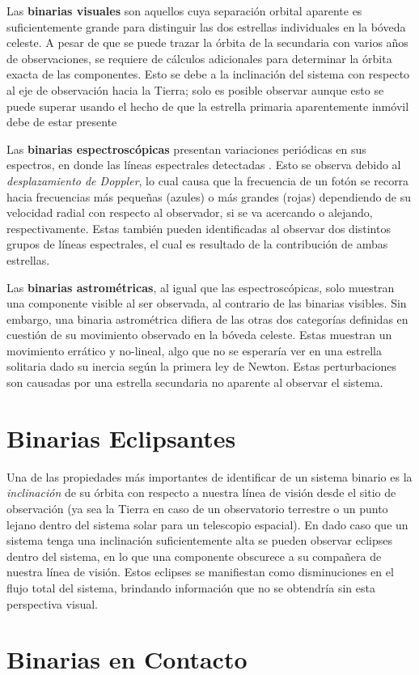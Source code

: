 Las \textbf{binarias visuales} son aquellos cuya separación orbital aparente es
suficientemente grande para distinguir las dos estrellas individuales en la
bóveda celeste. A pesar de que se puede trazar la órbita de la secundaria con
varios años de observaciones, se requiere de cálculos adicionales para
determinar la órbita exacta de las componentes. Esto se debe a la inclinación
del sistema con respecto al eje de observación hacia la Tierra; solo es posible
observar  aunque esto se puede superar usando el hecho de que la estrella primaria
aparentemente inmóvil debe de estar presente  

Las \textbf{binarias espectroscópicas} presentan variaciones periódicas en sus
espectros, en donde las líneas espectrales detectadas 
. Esto se observa
debido al \textit{desplazamiento de Doppler}, lo cual causa que la frecuencia de
un fotón se recorra hacia frecuencias más pequeñas (azules) o más grandes
(rojas) dependiendo de su velocidad radial con respecto al observador, si se va
acercando o alejando, respectivamente. Estas también pueden identificadas al
observar dos distintos grupos de líneas espectrales, el cual es resultado de la
contribución de ambas estrellas.

Las \textbf{binarias astrométricas}, al igual que las espectroscópicas, solo
muestran una componente visible al ser observada, al contrario de las binarias
visibles. Sin embargo, una binaria astrométrica difiera de las otras dos
categorías definidas en cuestión de su movimiento observado en la bóveda
celeste. Estas muestran un movimiento errático y no-lineal, algo que no se
esperaría ver en una estrella solitaria dado su inercia según la primera ley de
Newton. Estas perturbaciones son causadas por una estrella secundaria no
aparente al observar el sistema. 

\section{Binarias Eclipsantes}

Una de las propiedades más importantes de identificar de un sistema binario es
la \textit{inclinación} de su órbita con respecto a nuestra línea de visión
desde el sitio de observación (ya sea la Tierra en caso de un observatorio
terrestre o un punto lejano dentro del sistema solar para un telescopio
espacial). En dado caso que un sistema tenga una inclinación suficientemente
alta se pueden observar eclipses dentro del sistema, en lo que una componente
obscurece a su compañera de nuestra línea de visión. Estos eclipses se
manifiestan como disminuciones en el flujo total del sistema, brindando
información que no se obtendría sin esta perspectiva visual. 

\section{Binarias en Contacto}